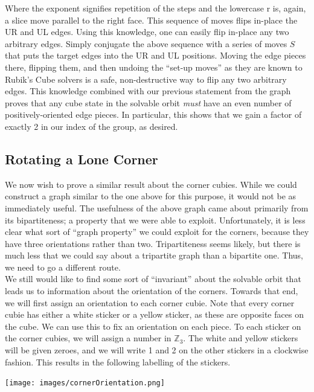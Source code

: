\documentclass[10pt,letterpaper]{report}
\begin{document}
Where the exponent signifies repetition of the steps and the lowercase r is, again, a slice move parallel to the right face. This sequence of moves flips in-place the UR and UL edges.  Using this knowledge, one can easily flip in-place any two arbitrary edges.  Simply conjugate the above sequence with a series of moves $S$ that puts the target edges into the UR and UL positions.  Moving the edge pieces there, flipping them, and then undoing the ``set-up moves'' as they are known to Rubik's Cube solvers is a safe, non-destructive way to flip any two arbitrary edges.  This knowledge combined with our previous statement from the graph proves that any cube state in the solvable orbit \textit{must} have an even number of positively-oriented edge pieces.  In particular, this shows that we gain a factor of exactly 2 in our index of the group, as desired.

\subsection{Rotating a Lone Corner}

We now wish to prove a similar result about the corner cubies.  While we could construct a graph similar to the one above for this purpose, it would not be as immediately useful.  The usefulness of the above graph came about primarily from its bipartiteness; a property that we were able to exploit.  Unfortunately, it is less clear what sort of ``graph property'' we could exploit for the corners, because they have three orientations rather than two.  Tripartiteness seems likely, but there is much less that we could say about a tripartite graph than a bipartite one.  Thus, we need to go a different route. \\

We still would like to find some sort of ``invariant'' about the solvable orbit that leads us to information about the orientation of the corners.  Towards that end, we will first assign an orientation to each corner cubie.  Note that every corner cubie has either a white sticker or a yellow sticker, as these are opposite faces on the cube.  We can use this to fix an orientation on each piece.  To each sticker on the corner cubies, we will assign a number in $\mathbb{Z}_3$.  The white and yellow stickers will be given zeroes, and we will write 1 and 2 on the other stickers in a clockwise fashion.  This results in the following labelling of the stickers.

\begin{center}
\texttt{[image: images/cornerOrientation.png]} 
\end{center}
\end{document}
